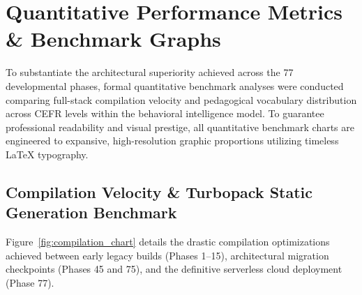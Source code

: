 \documentclass[12pt,a4paper]{article}
\begin{document}
\section{Quantitative Performance Metrics \& Benchmark Graphs}

To substantiate the architectural superiority achieved across the 77 developmental phases, formal quantitative benchmark analyses were conducted comparing full-stack compilation velocity and pedagogical vocabulary distribution across CEFR levels within the behavioral intelligence model. To guarantee professional readability and visual prestige, all quantitative benchmark charts are engineered to expansive, high-resolution graphic proportions utilizing timeless LaTeX typography.

\subsection{Compilation Velocity \& Turbopack Static Generation Benchmark}
Figure~\ref{fig:compilation_chart} details the drastic compilation optimizations achieved between early legacy builds (Phases 1--15), architectural migration checkpoints (Phases 45 and 75), and the definitive serverless cloud deployment (Phase 77).
\end{document}
